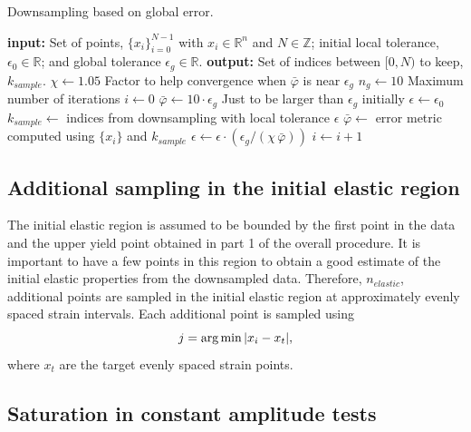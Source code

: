 \documentclass[a4paper,11pt]{article}
\begin{document}
\begin{algorithm}
	\caption{Downsampling based on global error.}
	\label{alg:global-err-downsampling}
	\begin{algorithmic}[1]
		\State \textbf{input:} Set of points, $\{x_i\}_{i=0}^{N-1}$ with $x_i \in \mathbb{R}^n$ and $N \in \mathbb{Z}$; initial local tolerance, $\epsilon_0 \in \mathbb{R}$; and
        global tolerance $\epsilon_g \in \mathbb{R}$.
        \State \textbf{output:} Set of indices between $[0, N)$ to keep, $k_{sample}$.
        \State $\chi \gets 1.05$
        \Comment Factor to help convergence when $\bar{\varphi}$ is near $\epsilon_g$
        \State $n_g \gets 10$
        \Comment Maximum number of iterations
        \State $i \gets 0$
        \State $\bar{\varphi} \gets 10 \cdot \epsilon_g$
        \Comment Just to be larger than $\epsilon_g$ initially
        \State $\epsilon \gets \epsilon_0$
            \State $k_{sample} \gets$ indices from downsampling with local tolerance $\epsilon$
            \State $\bar{\varphi} \gets$ error metric computed using $\{x_i\}$ and $k_{sample}$
                \State $\epsilon \gets \epsilon \cdot (\epsilon_g / (\chi \, \bar{\varphi}))$
                \State $i \gets i + 1$
            \EndIf
		\EndWhile
\end{algorithmic}
\end{algorithm}

\subsection{Additional sampling in the initial elastic region}

The initial elastic region is assumed to be bounded by the first point in the data and the upper yield point obtained in part 1 of the overall procedure.
It is important to have a few points in this region to obtain a good estimate of the initial elastic properties from the downsampled data.
Therefore, $n_{elastic}$, additional points are sampled in the initial elastic region at approximately evenly spaced strain intervals.
Each additional point is sampled using
\begin{equation}
    j = \arg \min \abs{x_i - x_{t}},
\end{equation}
where $x_t$ are the target evenly spaced strain points.

\subsection{Saturation in constant amplitude tests}
\end{document}
